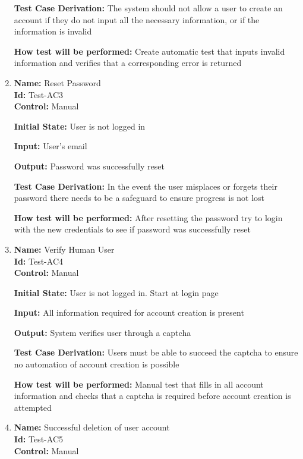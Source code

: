 \documentclass[12pt, titlepage]{article}
\begin{document}
\begin{enumerate}
\textbf{Test Case Derivation:} The system should not allow a user to create an account if they do not input all the necessary information, or if the information is invalid

\textbf{How test will be performed:} Create automatic test that inputs invalid information and verifies that a corresponding error is returned


\item{\textbf{Name:} Reset Password\\} \label{Test-AC3} %
\textbf{Id:} Test-AC3 \label{Test-AC3}\\

\textbf{Control:} Manual

\textbf{Initial State:} User is not logged in

\textbf{Input:} User's email

\textbf{Output:} Password was successfully reset

\textbf{Test Case Derivation:} In the event the user misplaces or forgets their password there needs to be a safeguard to ensure progress is not lost

\textbf{How test will be performed:} After resetting the password try to login with the new credentials to see if password was successfully reset


\item{\textbf{Name:} Verify Human User\\} %
\textbf{Id:} Test-AC4 \label{Test-AC4}\\

\textbf{Control: }Manual
					
\textbf{Initial State:} User is not logged in. Start at login page
					
\textbf{Input: }All information required for account creation is present
					
\textbf{Output: }System verifies user through a captcha

\textbf{Test Case Derivation: }Users must be able to succeed the captcha to ensure no automation of account creation is possible

\textbf{How test will be performed:} Manual test that fills in all account information and checks that a captcha is required before account creation is attempted

\item{\textbf{Name:} Successful deletion of user account\\} %
\textbf{Id:} Test-AC5    \label{Test-AC5}\\
\textbf{Control:} Manual
					

\end{enumerate}
\end{document}
